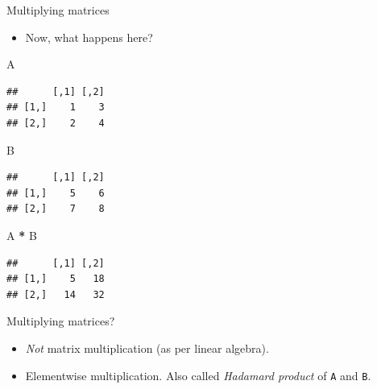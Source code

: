 \documentclass[
  ignorenonframetext,
]{beamer}
\newenvironment{Shaded}{\begin{snugshade}}{\end{snugshade}}
\newcommand{\NormalTok}[1]{#1}
\newcommand{\OperatorTok}[1]{\textcolor[rgb]{0.81,0.36,0.00}{\textbf{#1}}}
\newcommand{\StringTok}[1]{\textcolor[rgb]{0.31,0.60,0.02}{#1}}
\providecommand{\tightlist}{%
  \setlength{\itemsep}{0pt}\setlength{\parskip}{0pt}}
\begin{document}
\begin{frame}[fragile]{Multiplying matrices}
\protect\hypertarget{multiplying-matrices}{}

\begin{itemize}
\tightlist
\item
  Now, what happens here?
\end{itemize}

\begin{Shaded}
\begin{Highlighting}[]
\NormalTok{A}
\end{Highlighting}
\end{Shaded}

\begin{verbatim}
##      [,1] [,2]
## [1,]    1    3
## [2,]    2    4
\end{verbatim}

\begin{Shaded}
\begin{Highlighting}[]
\NormalTok{B}
\end{Highlighting}
\end{Shaded}

\begin{verbatim}
##      [,1] [,2]
## [1,]    5    6
## [2,]    7    8
\end{verbatim}

\begin{Shaded}
\begin{Highlighting}[]
\NormalTok{A }\OperatorTok{*}\StringTok{ }\NormalTok{B}
\end{Highlighting}
\end{Shaded}

\begin{verbatim}
##      [,1] [,2]
## [1,]    5   18
## [2,]   14   32
\end{verbatim}

\end{frame}

\begin{frame}[fragile]{Multiplying matrices?}
\protect\hypertarget{multiplying-matrices-1}{}

\begin{itemize}
\tightlist
\item
  \emph{Not} matrix multiplication (as per linear algebra).
\item
  Elementwise multiplication. Also called \emph{Hadamard product} of
  \texttt{A} and \texttt{B}.
\end{itemize}

\end{frame}
\end{document}
